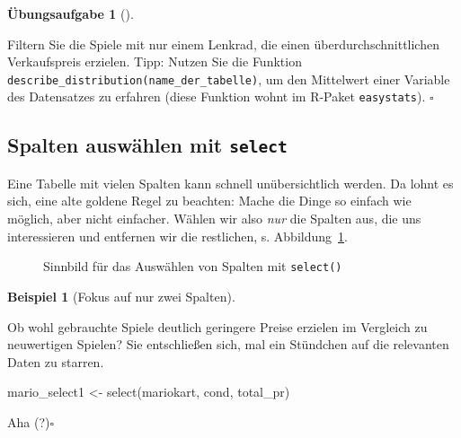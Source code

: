 \documentclass[
  a4paper,
  DIV=11]{scrreprt}
\newenvironment{Shaded}{\begin{snugshade}}{\end{snugshade}}
\newcommand{\FunctionTok}[1]{\textcolor[rgb]{0.28,0.35,0.67}{#1}}
\newcommand{\NormalTok}[1]{\textcolor[rgb]{0.00,0.23,0.31}{#1}}
\newcommand{\OtherTok}[1]{\textcolor[rgb]{0.00,0.23,0.31}{#1}}
\theoremstyle{definition}
\newtheorem{exercise}{Übungsaufgabe}[chapter]
\theoremstyle{definition}
\newtheorem{example}{Beispiel}[chapter]
\theoremstyle{definition}
\theoremstyle{remark}
\begin{document}
\begin{exercise}[]\protect\hypertarget{exr-filter3}{}\label{exr-filter3}

Filtern Sie die Spiele mit nur einem Lenkrad, die einen
überdurchschnittlichen Verkaufspreis erzielen. Tipp: Nutzen Sie die
Funktion \texttt{describe\_distribution(name\_der\_tabelle)}, um den
Mittelwert einer Variable des Datensatzes zu erfahren (diese Funktion
wohnt im R-Paket \texttt{easystats}). \(\square\)

\end{exercise}

\subsection{\texorpdfstring{Spalten auswählen mit
\texttt{select}}{Spalten auswählen mit select}}\label{spalten-auswuxe4hlen-mit-select}

Eine Tabelle mit vielen Spalten kann schnell unübersichtlich werden. Da
lohnt es sich, eine alte goldene Regel zu beachten: Mache die Dinge so
einfach wie möglich, aber nicht einfacher. Wählen wir also \emph{nur}
die Spalten aus, die uns interessieren und entfernen wir die restlichen,
s. Abbildung~\ref{fig-select}.

\begin{figure}


\caption{\label{fig-select}Sinnbild für das Auswählen von Spalten mit
\texttt{select()}}

\end{figure}%

\begin{example}[Fokus auf nur zwei
Spalten]\protect\hypertarget{exm-select}{}\label{exm-select}

Ob wohl gebrauchte Spiele deutlich geringere Preise erzielen im
Vergleich zu neuwertigen Spielen? Sie entschließen sich, mal ein
Stündchen auf die relevanten Daten zu starren.

\begin{Shaded}
\begin{Highlighting}[]
\NormalTok{mario\_select1 }\OtherTok{\textless{}{-}} \FunctionTok{select}\NormalTok{(mariokart, cond, total\_pr)}
\end{Highlighting}
\end{Shaded}

Aha (?)\(\square\)

\end{example}
\end{document}
